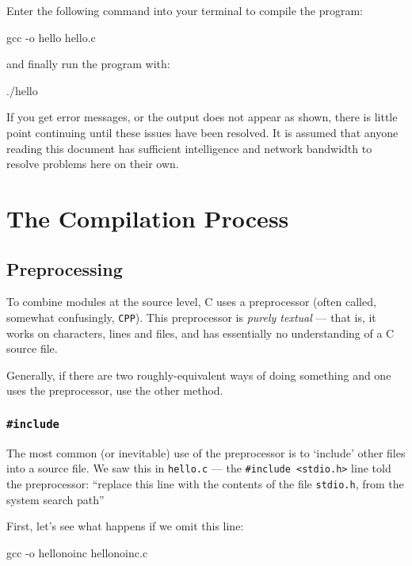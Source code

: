 \documentclass[a4paper,10pt]{article}
\newcommand{\kw}[1]{\texttt{#1}}
\newcommand{\filename}[1]{\texttt{#1}}
\newcommand{\drmcode}[3]{\noindent\begin{minipage}{\columnwidth}\end{minipage}}
\newcommand{\cfile}[1]{\drmcode{C}{\filename{#1}}{#1}}
\begin{document}
\cfile{hello.c}

\noindent
Enter the following command into your terminal to compile
the program:

gcc -o hello hello.c
\END

\noindent
and finally run the program with:

./hello
\END

\noindent{}
If you get error messages, or the output does not appear as shown,
there is little point continuing until these issues have been
resolved. It is assumed that anyone reading this document has
sufficient intelligence and network bandwidth to resolve problems here
on their own.

\section{The Compilation Process}



\subsection{Preprocessing}

To combine modules at the source level, C uses a preprocessor (often
called, somewhat confusingly, \kw{CPP}). This preprocessor is
\emph{purely textual} --- that is, it works on characters, lines and
files, and has essentially no understanding of a C source file.



Generally, if there are two roughly-equivalent ways of doing something
and one uses the preprocessor, use the other method.

\subsubsection{\kw{\#include}}

The most common (or inevitable) use of the preprocessor is to
`include' other files into a source file. We saw this in \filename{hello.c}
--- the \verb!#include <stdio.h>! line told the preprocessor:
``replace this line with the contents of the file \filename{stdio.h}, from
the system search path''

First, let's see what happens if we omit this line:

\cfile{hellonoinc.c}

gcc -o hellonoinc hellonoinc.c
\END
\end{document}
